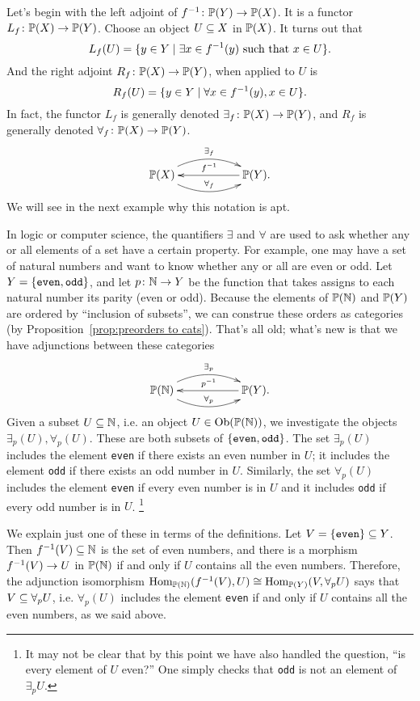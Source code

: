 \documentclass[CT4S-EN-RU]{subfiles}
\begin{document}
\begin{blockRUS}
\end{blockRUS}

\begin{blockENG}
Let's begin with the left adjoint of $f^\m1\taking\PP(Y)\to\PP(X)$. It is a functor $L_f\taking\PP(X)\to\PP(Y)$. Choose an object $U\ss X$ in $\PP(X)$. It turns out that
$$L_f(U)=\{y\in Y\|\exists x\in f^\m1(y)\tn{ such that }x\in U\}.$$
And the right adjoint $R_f\taking\PP(X)\to\PP(Y)$, when applied to $U$ is 
$$R_f(U)=\{y\in Y\|\forall x\in f^\m1(y), x\in U\}.$$
In fact, the functor $L_f$ is generally denoted $\exists_f\taking\PP(X)\to\PP(Y)$, and $R_f$ is generally denoted $\forall_f\taking\PP(X)\to\PP(Y)$. 
$$
\xymatrix{\PP(X)\ar@/^1.2pc/[rr]^{\exists_f}\ar@/_1.2pc/[rr]^{\forall_f}&&\PP(Y)\ar[ll]_{f^\m1}.}
$$
We will see in the next example why this notation is apt.
\end{blockENG}

\begin{blockRUS}
\end{blockRUS}

\begin{exampleENG}
In logic or computer science, the quantifiers $\exists$ and $\forall$ are used to ask whether any or all elements of a set have a certain property. For example, one may have a set of natural numbers and want to know whether any or all are even or odd.
Let $Y=\{{\tt even,odd}\}$, and let $p\taking\NN\to Y$ be the function that takes assigns to each natural number its parity (even or odd). Because the elements of $\PP(\NN)$ and $\PP(Y)$ are ordered by “inclusion of subsets”, we can construe these orders as categories (by Proposition~\ref{prop:preorders to cats}). That's all old; what's new is that we have adjunctions between these categories
$$
\xymatrix{\PP(\NN)\ar@/^1.2pc/[rr]^{\exists_p}\ar@/_1.2pc/[rr]^{\forall_p}&&\PP(Y)\ar[ll]_{p^\m1}.}
$$
Given a subset $U\ss\NN$, i.e. an object $U\in\Ob(\PP(\NN))$, we investigate the objects $\exists_p(U),\forall_p(U)$. These are both subsets of $\{{\tt even,odd}\}$. The set $\exists_p(U)$ includes the element {\tt even} if there exists an even number in $U$; it includes the element {\tt odd} if there exists an odd number in $U$. Similarly, the set $\forall_p(U)$ includes the element {\tt even} if every even number is in $U$ and it includes {\tt odd} if every odd number is in $U$.
\footnote{It may not be clear that by this point we have also handled the question, “is every element of $U$ even?” One simply checks that {\tt odd} is not an element of $\exists_pU$.}

We explain just one of these in terms of the definitions. Let $V=\{{\tt even}\}\ss Y$. Then $f^\m1(V)\ss\NN$ is the set of even numbers, and there is a morphism $f^\m1(V)\to U$ in $\PP(\NN)$ if and only if $U$ contains all the even numbers. Therefore, the adjunction isomorphism $\Hom_{\PP(\NN)}(f^\m1(V),U)\iso\Hom_{\PP(Y)}(V,\forall_pU)$ says that $V\ss\forall_pU$, i.e. $\forall_p(U)$ includes the element {\tt even} if and only if $U$ contains all the even numbers, as we said above.
\end{exampleENG}
\end{document}
